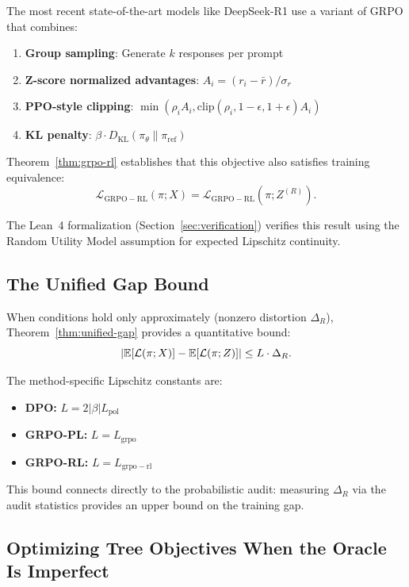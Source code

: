The most recent state-of-the-art models like DeepSeek-R1 use a variant of GRPO that combines:
\begin{enumerate}[nosep]
    \item \textbf{Group sampling}: Generate $k$ responses per prompt
    \item \textbf{Z-score normalized advantages}: $A_i = (r_i - \bar{r}) / \sigma_r$
    \item \textbf{PPO-style clipping}: $\min(\rho_i A_i, \text{clip}(\rho_i, 1-\epsilon, 1+\epsilon) A_i)$
    \item \textbf{KL penalty}: $\beta \cdot D_{\mathrm{KL}}(\pi_\theta \| \pi_{\mathrm{ref}})$
\end{enumerate}

Theorem~\ref{thm:grpo-rl} establishes that this objective also satisfies training equivalence:
\[
\mathcal{L}_{\mathrm{GRPO-RL}}(\pi; X) = \mathcal{L}_{\mathrm{GRPO-RL}}(\pi; Z^{(R)}).
\]

The Lean~4 formalization (Section~\ref{sec:verification}) verifies this result using the Random Utility Model assumption for expected Lipschitz continuity.

\subsection{The Unified Gap Bound}

When conditions hold only approximately (nonzero distortion $\Delta_R$), Theorem~\ref{thm:unified-gap} provides a quantitative bound:
\[
\left| \mathbb{E}[\mathcal{L}(\pi; X)] - \mathbb{E}[\mathcal{L}(\pi; Z)] \right| \le L \cdot \Delta_R.
\]

The method-specific Lipschitz constants are:
\begin{itemize}[nosep]
    \item \textbf{DPO:} $L = 2|\beta| L_{\mathrm{pol}}$
    \item \textbf{GRPO-PL:} $L = L_{\mathrm{grpo}}$
    \item \textbf{GRPO-RL:} $L = L_{\mathrm{grpo-rl}}$
\end{itemize}

This bound connects directly to the probabilistic audit: measuring $\Delta_R$ via the audit statistics provides an upper bound on the training gap.

\subsection{Optimizing Tree Objectives When the Oracle Is Imperfect}

